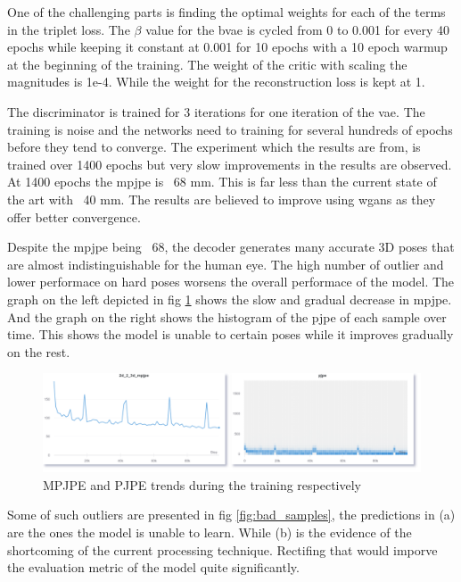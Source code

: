One of the challenging parts is finding the optimal weights for each of the terms in the triplet loss. The $\beta$ value for the \ac{bvae} is cycled from 0 to 0.001 for every 40 epochs while keeping it constant at 0.001 for 10 epochs with a 10 epoch warmup at the beginning of the training. The weight of the critic with scaling the magnitudes is 1e-4. While the weight for the reconstruction loss is kept at 1. 

The discriminator is trained for 3 iterations for one iteration of the \ac{vae}. The training is noise and the networks need to training for several hundreds of epochs before they tend to converge. The experiment which the results are from, is trained over 1400 epochs but very slow improvements in the results are observed. At 1400 epochs the \ac{mpjpe} is ~68 mm. This is far less than the current state of the art \cite{amazon1} with ~40 mm. The results are believed to improve using \acp{wgan} as they offer better convergence. 

Despite the \ac{mpjpe} being ~68, the decoder generates many accurate 3D poses that are almost indistinguishable for the human eye. The high number of outlier and lower performace on hard poses worsens the overall performace of the model. The graph on the left depicted in fig \ref{fig:mpjpe_trends} shows the slow and gradual decrease in \ac{mpjpe}. And the graph on the right shows the histogram of the \ac{pjpe} of each sample over time. This shows the model is unable to certain poses while it improves gradually on the rest. 

\begin{figure}[!h]
    \centering
    \includegraphics[scale=0.2]{figures/mpjpe_trend.png}
    \caption{MPJPE and PJPE trends during the training respectively}
    \label{fig:mpjpe_trends}
\end{figure}

Some of such outliers are presented in fig \ref{fig:bad_samples}, the predictions in (a) are the ones the model is unable to learn. While (b) is the evidence of the shortcoming of the current processing technique. Rectifing that would imporve the evaluation metric of the model quite significantly.


